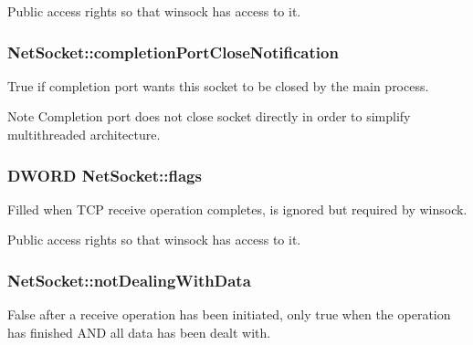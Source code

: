 Public access rights so that winsock has access to it. \hypertarget{class_net_socket_aeff1c796b40fa0545b6b3f2bb7767f4d}{
\subsubsection[{completionPortCloseNotification}]{ {\bf NetSocket::completionPortCloseNotification}}}
\label{class_net_socket_aeff1c796b40fa0545b6b3f2bb7767f4d}


True if completion port wants this socket to be closed by the main process. 

\begin{DoxyNote}{Note}
Completion port does not close socket directly in order to simplify multithreaded architecture. 
\end{DoxyNote}
\hypertarget{class_net_socket_a794267d0dd5ed57e8d9bfdfea01d2995}{
\subsubsection[{flags}]{\setlength{\rightskip}{0pt plus 5cm}DWORD {\bf NetSocket::flags}}}
\label{class_net_socket_a794267d0dd5ed57e8d9bfdfea01d2995}


Filled when TCP receive operation completes, is ignored but required by winsock. 

Public access rights so that winsock has access to it. \hypertarget{class_net_socket_a03f60f949b31ee3feae0d1d3daa3bf3c}{
\subsubsection[{notDealingWithData}]{ {\bf NetSocket::notDealingWithData}}}
\label{class_net_socket_a03f60f949b31ee3feae0d1d3daa3bf3c}


False after a receive operation has been initiated, only true when the operation has finished AND all data has been dealt with. 

